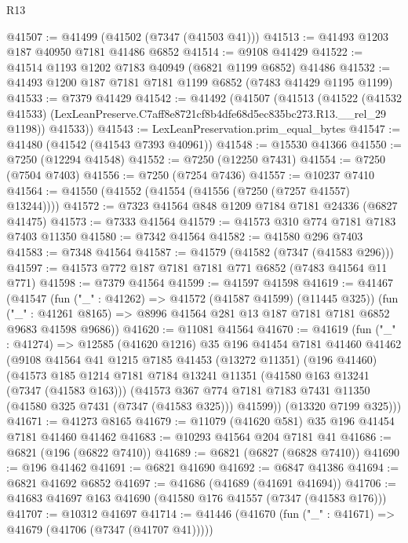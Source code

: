 \begin{lexlean}{R13}
\begin{coremodule}
@41507 := @41499 (@41502 (@7347 (@41503 @41)))
@41513 := @41493 @1203 @187 @40950 @7181 @41486 @6852
@41514 := @9108 @41429
@41522 := @41514 @1193 @1202 @7183 @40949 (@6821 @1199 @6852) @41486
@41532 := @41493 @1200 @187 @7181 @7181 @1199 @6852 (@7483 @41429 @1195 @1199)
@41533 := @7379 @41429
@41542 := @41492
    (@41507
      (@41513
        (@41522
          (@41532 @41533)
          (LexLeanPreserve.C7aff8e8721cf8b4dfe68d5ec835bc273.R13.__rel_29 @1198))
        @41533))
@41543 := LexLeanPreservation.prim_equal_bytes
@41547 := @41480 (@41542 (@41543 @7393 @40961))
@41548 := @15530 @41366
@41550 := @7250 (@12294 @41548)
@41552 := @7250 (@12250 @7431)
@41554 := @7250 (@7504 @7403)
@41556 := @7250 (@7254 @7436)
@41557 := @10237 @7410
@41564 := @41550 (@41552 (@41554 (@41556 (@7250 (@7257 @41557) @13244))))
@41572 := @7323 @41564 @848 @1209 @7184 @7181 @24336 (@6827 @41475)
@41573 := @7333 @41564
@41579 := @41573 @310 @774 @7181 @7183 @7403 @11350
@41580 := @7342 @41564
@41582 := @41580 @296 @7403
@41583 := @7348 @41564
@41587 := @41579 (@41582 (@7347 (@41583 @296)))
@41597 := @41573 @772 @187 @7181 @7181 @771 @6852 (@7483 @41564 @11 @771)
@41598 := @7379 @41564
@41599 := @41597 @41598
@41619 := @41467
    (@41547
      (fun ("_" : @41262) => @41572 (@41587 @41599) (@11445 @325))
      (fun ("_" : @41261 @8165) => @8996 @41564 @281 @13 @187 @7181 @7181 @6852 @9683 @41598 @9686))
@41620 := @11081 @41564
@41670 := @41619
    (fun ("_" : @41274) =>
    @12585
      (@41620 @1216)
      @35
      @196
      @41454
      @7181
      @41460
      @41462
      (@9108
        @41564
        @41
        @1215
        @7185
        @41453
        (@13272 @11351)
        (@196 @41460)
        (@41573
          @185
          @1214
          @7181
          @7184
          @13241
          @11351
          (@41580 @163 @13241 (@7347 (@41583 @163)))
          (@41573
            @367
            @774
            @7181
            @7183
            @7431
            @11350
            (@41580 @325 @7431 (@7347 (@41583 @325)))
            @41599))
        (@13320 @7199 @325)))
@41671 := @41273 @8165
@41679 := @11079 (@41620 @581) @35 @196 @41454 @7181 @41460 @41462
@41683 := @10293 @41564 @204 @7181 @41
@41686 := @6821 (@196 (@6822 @7410))
@41689 := @6821 (@6827 (@6828 @7410))
@41690 := @196 @41462
@41691 := @6821 @41690
@41692 := @6847 @41386
@41694 := @6821 @41692 @6852
@41697 := @41686 (@41689 (@41691 @41694))
@41706 := @41683 @41697 @163 @41690 (@41580 @176 @41557 (@7347 (@41583 @176)))
@41707 := @10312 @41697
@41714 := @41446 (@41670 (fun ("_" : @41671) => @41679 (@41706 (@7347 (@41707 @41)))))

\end{coremodule}
\end{lexlean}
